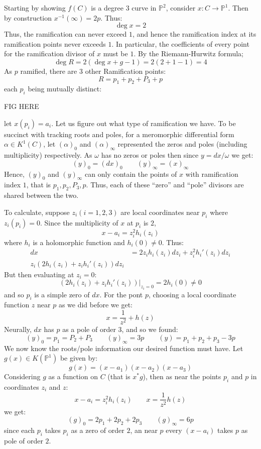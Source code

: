 \documentclass{book}
\renewcommand{\P}{{\mathbb{P}}}
\begin{document}
\begin{Proof}
  Starting by showing $f(C)$ is a degree $3$ curve in $\P^2$, consider $x: C \to \P^1$. Then by construction
  $x^{-1}(\infty) = 2p$. Thus:
  \[
    \deg x = 2
  \]
  Thus, the ramification can never exceed $1$, and hence the ramification index at its ramification points
  never exceeds $1$. In particular, the coefficients of every point for the ramification divisor of $x$ must
  be $1$. By the Riemann-Hurwitz formula;
  \[
    \deg R = 2(\deg x + g-1) = 2(2+1-1) = 4
  \]
  As $p$ ramified, there are $3$ other Ramification points:
  \[
    R = p_1 + p_2 + P_3 + p
  \]
  each $p_i$ being mutually distinct:

  \begin{center}
    FIG HERE
  \end{center}
  let $x(p_i) = a_i$. Let us figure out what type of ramification we have. To be succinct with tracking roots
  and poles, for a meromorphic differential form $\alpha \in K^1(C)$, let $(\alpha)_0$ and
  $(\alpha)_\infty$ represented the zeros and poles (including multiplicity) respectively. As $\omega$ has no
  zeros or poles then since $y = dx/\omega$ we get:
  \[
    (y)_0 = (dx)_0 \qquad (y)_\infty = (x)_\infty
  \]
  Hence, $(y)_0$ and $(y)_\infty$ can only contain the points of $x$ with ramification index $1$, that is
  $p_1, p_2, P_3, p$. Thus, each of these ``zero'' and ``pole'' divisors are shared between the two.

  To calculate, suppose $z_i (i = 1,2,3)$ are local coordinates near $p_i$ where $z_i(p_i) = 0$. Since the multiplicity of
  $x$ at $p_i$ is $2$,
  \[
    x - a_i = z_i^2h_i(z_i)
  \]
  where $h_i$ is a holomorphic function and $h_i(0) \ne 0$. Thus:
  \begin{align*}
   dx &= 2z_ih_i(z_i)dz_i + z_i^2 h_i'(z_i)dz_i\\
   z_i(2h_i(z_i) + z_ih_i'(z_i))dz_i
  \end{align*}
  But then evaluating at $z_i = 0$:
  \[
    (2h_i(z_i) + z_ih_i'(z_i))|_{z_i=0} = 2h_i(0) \ne 0
  \]
  and so $p_i$ is a simple zero of $dx$. For the pont $p$, choosing a local coordinate function $z$ near $p$
  as we did before we get:
  \[
    x = \frac{1}{z^2} + h(z)
  \]
  Neurally, $dx$ has $p$ as a pole of order $3$, and so we found:
  \[
    (y)_0 = p_1 = P_2 + P_3 \qquad (y)_\infty = 3p \qquad (y) = p_1 + p_2 + p_3 - 3p
  \]
  We now know the roots/pole information our desired function must have. Let $g(x) \in K(\P^1)$ be given by:
  \[
    g(x) = (x-a_1)(x-a_2)(x-a_3)
  \]
  Considering $g$ as a function on $C$ (that is $x^*g$), then as near the points $p_i$ and $p$ in coordinates
  $z_i$ and $z$:
  \[
    x-a_i = z_i^2h_i(z_i) \qquad x = \frac{1}{z^2}h(z)
  \]
  we get:
  \[
    (g)_0 = 2p_1 + 2p_2 + 2p_3 \qquad (g)_\infty = 6p
  \]
  since each $p_i$ takes $p_i$ as a zero of order $2$, an near $p$ every $(x-a_i)$ takes $p$ as  pole of order
  $2$.


\end{Proof}
\end{document}
